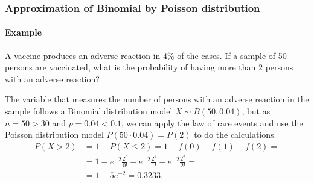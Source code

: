 \begin{frame}
\frametitle{Approximation of Binomial by Poisson distribution}
\framesubtitle{Example}
A vaccine produces an adverse reaction in 4\% of the cases.
If a sample of 50 persons are vaccinated, what is the probability of having more than 2 persons with an adverse
reaction?

The variable that measures the number of persons with an adverse reaction in the sample follows a Binomial distribution
model $X\sim B(50,0.04)$, but as $n=50>30$ and $p=0.04<0.1$, we can apply the law of rare events and use the
Poisson distribution model $P(50\cdot 0.04)=P(2)$ to do the calculations. 
\begin{align*}
P(X>2) &= 1-P(X\leq 2) = 1-f(0)-f(1)-f(2) =\\
&= 1-e^{-2}\frac{2^0}{0!}-e^{-2}\frac{2^1}{1!}-e^{-2}\frac{2^2}{2!} =\\
&= 1-5e^{-2} = 0.3233.
\end{align*}
\end{frame}


